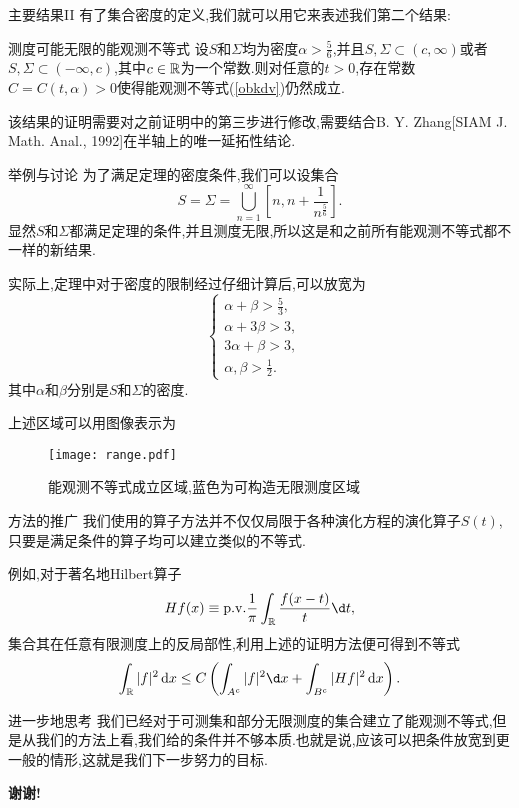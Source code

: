 \begin{frame}[t]{主要结果II}
  有了集合密度的定义,我们就可以用它来表述我们第二个结果:
  \begin{alertblock}{测度可能无限的能观测不等式}
    设$S$和$\Sigma$均为密度$\alpha>\frac{5}{6}$,并且$S,\Sigma \subset (c,\infty)$或者$S,\Sigma\subset (-\infty,c)$,其中$c\in \mathbb{R}$为一个常数.则对任意的$t>0$,存在常数$C=C(t,\alpha)>0$使得能观测不等式(\ref{obkdv})仍然成立.
  \end{alertblock}
  该结果的证明需要对之前证明中的第三步进行修改,需要结合B. Y. Zhang[SIAM J. Math. Anal., 1992]在半轴上的唯一延拓性结论.
\end{frame}

\begin{frame}[t]{举例与讨论}
  为了满足定理的密度条件,我们可以设集合
  \begin{equation}
    S=\Sigma=\bigcup_{n=1}^{\infty}[n,n+\frac{1}{n^{\frac{5}{6}}}].
  \end{equation}
  显然$S$和$\Sigma$都满足定理的条件,并且测度无限,所以这是和之前所有能观测不等式都不一样的新结果.

  实际上,定理中对于密度的限制经过仔细计算后,可以放宽为
  \begin{equation}
    \begin{cases}
      \alpha+\beta>\frac{5}{3}, &\\
      \alpha+3\beta>3, &\\
      3\alpha+\beta>3,&\\
      \alpha,\beta>\frac{1}{2}.&

    \end{cases}
  \end{equation}
  其中$\alpha$和$\beta$分别是$S$和$\Sigma$的密度.
\end{frame}
\begin{frame}[t]
  上述区域可以用图像表示为
  \begin{figure}[ht]
    \texttt{[image: range.pdf]}
    \centering
    \caption{能观测不等式成立区域,蓝色为可构造无限测度区域}
    \label{fig1}
    \end{figure}
\end{frame}
\begin{frame}[t]{方法的推广}
  我们使用的算子方法并不仅仅局限于各种演化方程的演化算子$S(t)$,只要是满足条件的算子均可以建立类似的不等式.

  例如,对于著名地Hilbert算子
  \begin{equation}
    Hf(x)\equiv \mathrm{p.v.}\frac{1}{\pi}\int_{\R}\frac{f(x-t)}{t}\d t,
  \end{equation}
  集合其在任意有限测度上的反局部性,利用上述的证明方法便可得到不等式
  \begin{equation}
    \int_{\R}|f|^2\,\mathrm{d} x\le C\left(\int_{A^c} |f|^2\d x+\int_{B^c}|Hf|^2\,\mathrm{d} x\right).
  \end{equation}
\end{frame}

\begin{frame}[t]{进一步地思考}
  我们已经对于可测集和部分无限测度的集合建立了能观测不等式,但是从我们的方法上看,我们给的条件并不够本质.也就是说,应该可以把条件放宽到更一般的情形,这就是我们下一步努力的目标.
  \begin{center}
   \Huge\bf 谢谢!
  \end{center}
\end{frame}